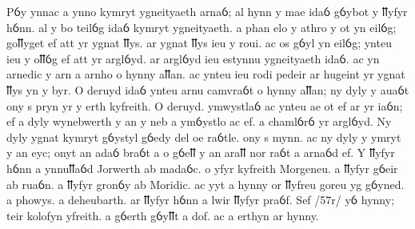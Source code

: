 \begin{spacing}{1}
\begin{pages}
\begin{Rightside}
      \pend
      \pstart
      Pỽy ynnac a ynno kymryt ygneityaeth arnaỽ; al hynn y mae idaỽ gỽybot y ỻyfyr hỽnn. al y bo teilỽg idaỽ kymryt ygneityaeth. a phan elo y athro y ot yn eilỽg; goỻyget ef att yr ygnat ỻys. ar ygnat ỻys ieu y roui. ac os gỽyl yn eilỽg; ynteu ieu y oỻỽg ef att yr arglỽyd. ar arglỽyd ieu estynnu ygneityaeth idaỽ. ac yn arnedic y arn a arnho o hynny aỻan. ac ynteu ieu rodi pedeir ar hugeint yr ygnat ỻys yn y byr. O deruyd idaỽ ynteu arnu camvraỽt o hynny aỻan; ny dyly y auaỽt ony s pryn yr y erth kyfreith. O deruyd. ymwystlaỽ ac ynteu ae ot ef ar yr iaỽn; ef a dyly wynebwerth y an y neb a ymỽystlo ac ef. a chamlỽrỽ yr arglỽyd. Ny dyly ygnat kymryt gỽystyl gỽedy del oe raỽtle. ony s mynn. ac ny dyly y ymryt y an eyc; onyt an adaỽ braỽt a o gỽeỻ y an araỻ nor raỽt a arnaỽd ef.
      \pend
      \pstart
      Y ỻyfyr hỽnn a ynnuỻaỽd Jorwerth ab madaỽc. o yfyr kyfreith Morgeneu. a ỻyfyr gỽeir ab ruaỽn. a ỻyfyr gronỽy ab Moridic. ac yyt a hynny or ỻyfreu goreu yg gỽyned. a phowys. a deheubarth. ar ỻyfyr hỽnn a lwir ỻyfyr praỽf. Sef \textup{/57r/} yỽ hynny; teir kolofyn yfreith. a gỽerth gỽyỻt a dof. ac a erthyn ar hynny.
      \pend
      \endnumbering
    \end{Rightside}
  \end{pages} 
  \Pages
\end{spacing}



